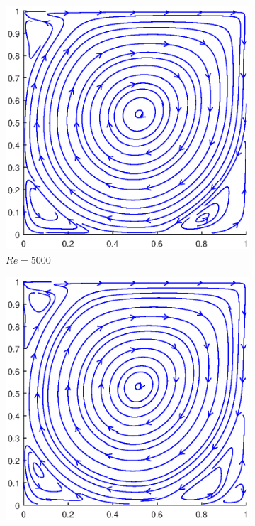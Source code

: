 \begin{figure}\ContinuedFloat
	\begin{subfigure}{0.5\textwidth}
		\includegraphics[scale=0.61]{DrivenCavity/5000}
		\caption{$Re=5000$}
	\end{subfigure}%
	\begin{subfigure}{0.5\textwidth}
		\includegraphics[scale=0.61]{DrivenCavity/7500}

\end{subfigure}
\end{figure}
